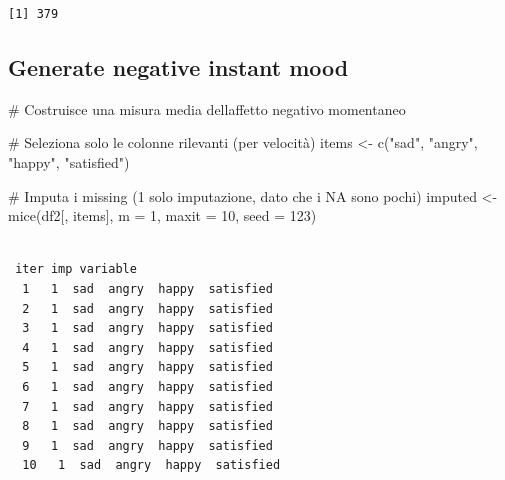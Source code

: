 \documentclass[
  11pt,
  a4paper,
  onecolumn]{article}
\newenvironment{Shaded}{}{}
\newcommand{\AttributeTok}[1]{\textcolor[rgb]{0.84,0.23,0.29}{#1}}
\newcommand{\CommentTok}[1]{\textcolor[rgb]{0.42,0.45,0.49}{#1}}
\newcommand{\DecValTok}[1]{\textcolor[rgb]{0.00,0.36,0.77}{#1}}
\newcommand{\FunctionTok}[1]{\textcolor[rgb]{0.44,0.26,0.76}{#1}}
\newcommand{\NormalTok}[1]{\textcolor[rgb]{0.14,0.16,0.18}{#1}}
\newcommand{\OtherTok}[1]{\textcolor[rgb]{0.44,0.26,0.76}{#1}}
\newcommand{\SpecialCharTok}[1]{\textcolor[rgb]{0.00,0.36,0.77}{#1}}
\newcommand{\StringTok}[1]{\textcolor[rgb]{0.01,0.18,0.38}{#1}}
\begin{document}
\begin{Shaded}
\end{Shaded}

\begin{verbatim}
[1] 379
\end{verbatim}

\subsection{Generate negative instant
mood}\label{generate-negative-instant-mood}

\begin{Shaded}
\begin{Highlighting}[]
\CommentTok{\# Costruisce una misura media dell\textquotesingle{}affetto negativo momentaneo}

\CommentTok{\# Seleziona solo le colonne rilevanti (per velocità)}
\NormalTok{items }\OtherTok{\textless{}{-}} \FunctionTok{c}\NormalTok{(}\StringTok{"sad"}\NormalTok{, }\StringTok{"angry"}\NormalTok{, }\StringTok{"happy"}\NormalTok{, }\StringTok{"satisfied"}\NormalTok{)}

\CommentTok{\# Imputa i missing (1 solo imputazione, dato che i NA sono pochi)}
\NormalTok{imputed }\OtherTok{\textless{}{-}} \FunctionTok{mice}\NormalTok{(df2[, items], }\AttributeTok{m =} \DecValTok{1}\NormalTok{, }\AttributeTok{maxit =} \DecValTok{10}\NormalTok{, }\AttributeTok{seed =} \DecValTok{123}\NormalTok{)}
\end{Highlighting}
\end{Shaded}

\begin{verbatim}

 iter imp variable
  1   1  sad  angry  happy  satisfied
  2   1  sad  angry  happy  satisfied
  3   1  sad  angry  happy  satisfied
  4   1  sad  angry  happy  satisfied
  5   1  sad  angry  happy  satisfied
  6   1  sad  angry  happy  satisfied
  7   1  sad  angry  happy  satisfied
  8   1  sad  angry  happy  satisfied
  9   1  sad  angry  happy  satisfied
  10   1  sad  angry  happy  satisfied
\end{verbatim}
\end{document}
